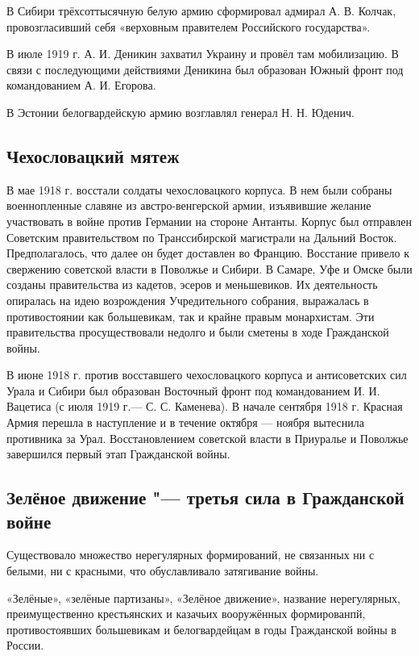 В Сибири трёхсоттысячную белую армию сформировал адмирал А. В. Колчак, провозгласивший себя «верховным правителем Российского государства».

В июле 1919 г. А. И. Деникин захватил Украину и провёл там мобилизацию. В связи с последующими действиями Деникина был образован Южный фронт под командованием А. И. Егорова.

В Эстонии белогвардейскую армию возглавлял генерал Н. Н. Юденич.

\subsection{Чехословацкий мятеж}

В мае 1918 г. восстали солдаты чехословацкого корпуса. В нем были собраны
военнопленные славяне из австро-венгерской армии, изъявившие желание участвовать в войне
против Германии на стороне Антанты. Корпус был отправлен Советским правительством по
Транссибирской магистрали на Дальний Восток. Предполагалось, что далее он будет доставлен
во Францию. Восстание привело к свержению советской власти в Поволжье и Сибири. В
Самаре, Уфе и Омске были созданы правительства из кадетов, эсеров и меньшевиков. Их
деятельность опиралась на идею возрождения Учредительного собрания, выражалась в
противостоянии как большевикам, так и крайне правым монархистам. Эти правительства
просуществовали недолго и были сметены в ходе Гражданской войны.

В июне 1918 г. против восставшего чехословацкого корпуса и антисоветских сил Урала и
Сибири был образован Восточный фронт под командованием И. И. Вацетиса (с июля 1919 г.—
С. С. Каменева). В начале сентября 1918 г. Красная Армия перешла в наступление и в течение
октября — ноября вытеснила противника за Урал. Восстановлением советской власти в
Приуралье и Поволжье завершился первый этап Гражданской войны.

\subsection{Зелёное движение "--- третья сила в Гражданской войне}

Существовало множество нерегулярных формирований, не связанных ни с белыми, ни с красными, что обуславливало затягивание войны.

«Зелёные», «зелёные партизаны», «Зелёное движение», название нерегулярных, преимущественно крестьянских и казачьих вооружённых формированпй, противостоявших большевикам и белогвардейцам в годы Гражданской войны в России.

